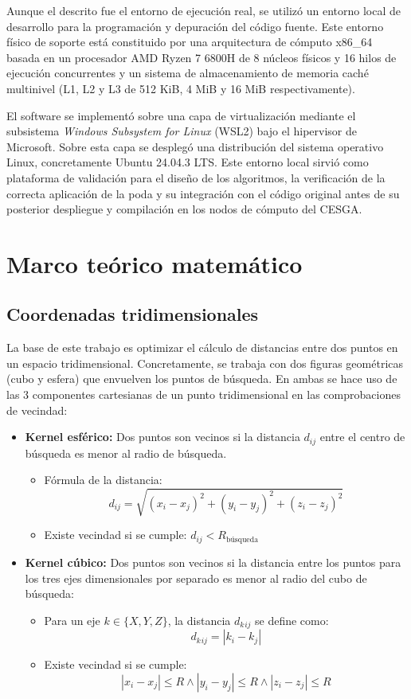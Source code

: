 Aunque el descrito fue el entorno de ejecución real, se utilizó un entorno local de desarrollo para la programación y depuración del código fuente. Este entorno físico de soporte está constituido por una arquitectura de cómputo x86\_64 basada en un procesador AMD Ryzen 7 6800H de 8 núcleos físicos y 16 hilos de ejecución concurrentes y un sistema de almacenamiento de memoria caché multinivel (L1, L2 y L3 de 512 KiB, 4 MiB y 16 MiB respectivamente). 

El software se implementó sobre una capa de virtualización mediante el subsistema \textit{Windows Subsystem for Linux} (WSL2) bajo el hipervisor de Microsoft. Sobre esta capa se desplegó una distribución del sistema operativo Linux, concretamente Ubuntu 24.04.3 LTS. Este entorno local sirvió como plataforma de validación para el diseño de los algoritmos, la verificación de la correcta aplicación de la poda y su integración con el código original antes de su posterior despliegue y compilación en los nodos de cómputo del CESGA.

\section{Marco teórico matemático}
\subsection{Coordenadas tridimensionales}
La base de este trabajo es optimizar el cálculo de distancias entre dos puntos en un espacio tridimensional. Concretamente, se trabaja con dos figuras geométricas (cubo y esfera) que envuelven los puntos de búsqueda. En ambas se hace uso de las 3 componentes cartesianas de un punto tridimensional en las comprobaciones de vecindad:
\begin{itemize}
    \item \textbf{Kernel esférico:} Dos puntos son vecinos si la distancia $d_{ij}$ entre el centro de búsqueda es menor al radio de búsqueda.

    \begin{itemize}
        \item Fórmula de la distancia: \[d_{ij} = \sqrt{(x_i - x_j)^2 + (y_i - y_j)^2 + (z_i - z_j)^2}\]
        \item Existe vecindad si se cumple: $d_{ij} < R_{\text{búsqueda}}$
    \end{itemize}

    \item \textbf{Kernel cúbico:} Dos puntos son vecinos si la distancia entre los puntos para los tres ejes dimensionales por separado es menor al radio del cubo de búsqueda:
    \begin{itemize}
        \item Para un eje $k \in \{X, Y, Z\}$, la distancia $d_k{}_{ij}$ se define como:
\[ d_k{}_{ij} = |k_i - k_j| \]
        \item Existe vecindad si se cumple:
        \[|x_i - x_j| \le R \land |y_i - y_j| \le R \land |z_i - z_j| \le R\]
    \end{itemize}

\end{itemize}


